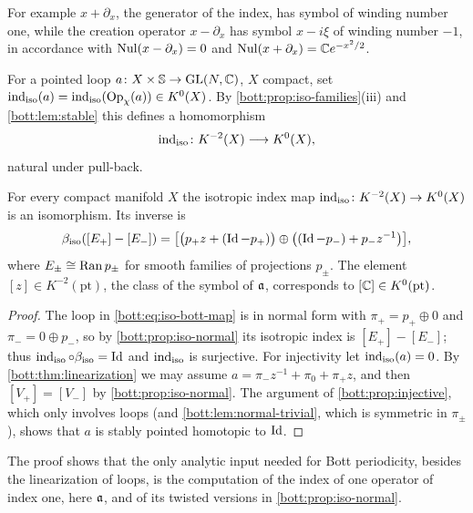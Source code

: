 For example $x+\partial_x$, the generator of the index, has symbol of winding number
one, while the creation operator $x-\partial_x$ has symbol $x-i\xi$ of winding number
$-1$, in accordance with $\operatorname{Nul}(x-\partial_x)=0$ and $\operatorname{Nul}(x+\partial_x)=\mathbb{C} e^{-x^2/2}$.

For a pointed loop $a\colon X\times\mathbb{S}\to\operatorname{GL}(N,\mathbb{C})$, $X$ compact, set
$\operatorname{ind}_{\mathrm{iso}}(a)=\operatorname{ind}_{\mathrm{iso}}(\operatorname{Op}_\chi(a))\in K^0(X)$. By \cref{bott:prop:iso-families}(iii) and
\cref{bott:lem:stable} this defines a homomorphism
\begin{equation*}
  \operatorname{ind}_{\mathrm{iso}}\colon K^{-2}(X)\longrightarrow K^0(X),
\end{equation*}
natural under pull-back.

\begin{theorem}\label{bott:thm:iso-bott}
  For every compact manifold $X$ the isotropic index map
  $\operatorname{ind}_{\mathrm{iso}}\colon K^{-2}(X)\to K^0(X)$ is an isomorphism. Its inverse is
  \begin{equation}\label{bott:eq:iso-bott-map}
    \beta_{\mathrm{iso}}([E_+]-[E_-])=\big[\big(p_+z+(\operatorname{Id}-p_+)\big)\oplus\big((\operatorname{Id}-p_-)+p_-z^{-1}\big)\big],
  \end{equation}
  where $E_\pm\cong\operatorname{Ran} p_\pm$ for smooth families of projections $p_\pm$. The element
  $[z]\in K^{-2}(\mathrm{pt})$, the class of the symbol of $\mathfrak{a}$, corresponds to
  $[\mathbb{C}]\in K^0(\mathrm{pt})$.
\end{theorem}
\begin{proof}
  The loop in \eqref{bott:eq:iso-bott-map} is in normal form with $\pi_+=p_+\oplus0$ and
  $\pi_-=0\oplus p_-$, so by \cref{bott:prop:iso-normal} its isotropic index is
  $[E_+]-[E_-]$; thus $\operatorname{ind}_{\mathrm{iso}}\circ\beta_{\mathrm{iso}}=\operatorname{Id}$ and $\operatorname{ind}_{\mathrm{iso}}$ is surjective.
  For injectivity let $\operatorname{ind}_{\mathrm{iso}}(a)=0$. By \cref{bott:thm:linearization} we may assume
  $a=\pi_-z^{-1}+\pi_0+\pi_+z$, and then $[V_+]=[V_-]$ by \cref{bott:prop:iso-normal}.
  The argument of \cref{bott:prop:injective}, which only involves loops (and
  \cref{bott:lem:normal-trivial}, which is symmetric in $\pi_\pm$), shows that $a$ is
  stably pointed homotopic to $\operatorname{Id}$.
\end{proof}

The proof shows that the only analytic input needed for Bott periodicity, besides the
linearization of loops, is the computation of the index of one operator of index one,
here $\mathfrak{a}$, and of its twisted versions in \cref{bott:prop:iso-normal}.

